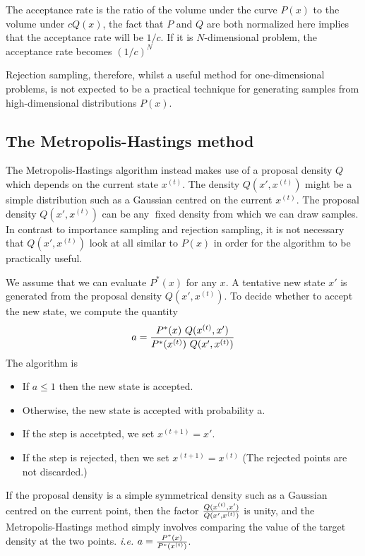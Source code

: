 \documentclass[a4paper,11pt]{article}
\numberwithin{equation}{section}
\begin{document}
{The
acceptance rate is the ratio of the volume under the curve $P(x)$ to the volume
under $cQ(x)$, the fact that $P$ and $Q$ are both normalized here implies that
the acceptance rate will be $1/c$. If it is $N$-dimensional problem, the acceptance rate becomes $(1/c)^N$ 

Rejection sampling, therefore, whilst a useful method for one-dimensional
problems, is not expected to be a practical technique for generating samples
from high-dimensional distributions $P(x)$.


\subsection{The Metropolis-Hastings method}

The Metropolis-Hastings algorithm instead makes use of a proposal density
$Q$ which depends on the current state $x^{(t)}$. The density $Q(x', x^{(t)})$ might
be a simple distribution such as a Gaussian centred on the current $x^{(t)}$. The
proposal density $Q(x', x^{(t)})$ can be any fixed density from which we can draw
samples. In contrast to importance sampling and rejection sampling, it is not
necessary that $Q(x', x^{(t)})$ look at all similar to $P(x)$ in order for the algorithm
to be practically useful.

We assume that we can evaluate $P^*(x)$ for any $x$. A tentative
new state $x'$ is generated from the proposal density $Q(x', x^{(t)})$. To decide whether to accept the new state, we compute the quantity
$$
a= {P^*(x)~Q( x^{(t)},x') \over P^*(x^{(t)})~Q(x', x^{(t)}) }
$$
The algorithm is 

\begin{itemize}
  \item If $a \le 1$ then the new state is accepted.  
  \item Otherwise, the new state is accepted with probability a. 
  \item If the step is accetpted, we set $x^{(t+1)}=x'$.
  \item If the step is rejected, then we set $x^{(t+1)}=x^{(t)}$ (The rejected points are not discarded.)
\end{itemize}

If the
proposal density is a simple symmetrical density such as a Gaussian centred on
the current point, then the factor ${Q( x^{(t)},x') \over Q(x', x^{(t)}) }$ is unity, and the Metropolis-Hastings
method simply involves comparing the value of the target density at the two
points. {\it i.e.} $a={P^*(x) \over P^*(x^{(t)})}$.

}
\end{document}
